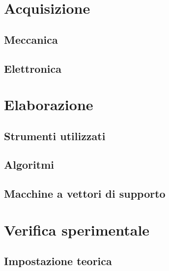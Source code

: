 \documentclass [10pt, a4paper, onecolumn, oneside] {scrreprt}
\numberwithin{endnote}{chapter}
\begin{document}
\chapter{Acquisizione} \label{cap:acquis}
		 \vfill\eject
	\section{Meccanica} \label{sez:meccanica}
		 \vfill
	\section{Elettronica} \label{sez:elettronica}
		 \vfill

\chapter{Elaborazione} \label{cap:elab}
		 \vfill\eject
	\section{Strumenti utilizzati} \label{sez:strumenti}
		 \vfill
	\section{Algoritmi} \label{sez:algoritmi}
		 \vfill
	\section{Macchine a vettori di supporto} \label{sez:svm}
		 \vfill


\chapter{Verifica sperimentale} \label{cap:verifica}
		 \vfill\eject
 \section{Impostazione teorica}
		 \vfill
		 \vfill
		 \vfill
\end{document}

